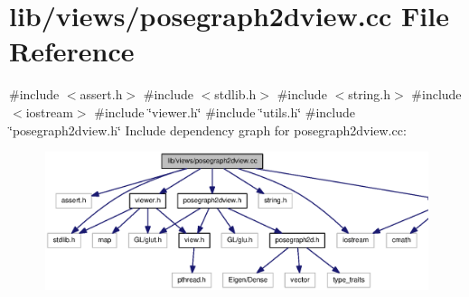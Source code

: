 \section{lib/views/posegraph2dview.cc \-File \-Reference}
\label{posegraph2dview_8cc}
{\ttfamily \#include $<$assert.\-h$>$}\*
{\ttfamily \#include $<$stdlib.\-h$>$}\*
{\ttfamily \#include $<$string.\-h$>$}\*
{\ttfamily \#include $<$iostream$>$}\*
{\ttfamily \#include \char`\"{}viewer.\-h\char`\"{}}\*
{\ttfamily \#include \char`\"{}utils.\-h\char`\"{}}\*
{\ttfamily \#include \char`\"{}posegraph2dview.\-h\char`\"{}}\*
\-Include dependency graph for posegraph2dview.\-cc\-:\nopagebreak
\begin{figure}[H]
\begin{center}
\leavevmode
\includegraphics[width=350pt]{posegraph2dview_8cc__incl}
\end{center}
\end{figure}
